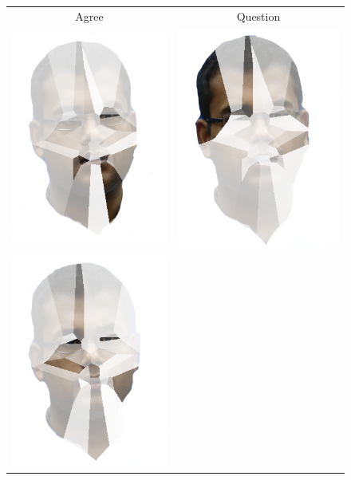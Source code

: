 \begin{figure}[tb]
\centering
\begin{tabular}{ cc }
Agree & Question \\
\includegraphics[width = 0.39 \columnwidth]{featureselection/visoutput-agree-crop-bng.png} &
\includegraphics[width = 0.39 \columnwidth]{featureselection/visoutput-question-crop-bng.png} \\
\includegraphics[width = 0.39 \columnwidth]{featureselection/visoutput-thinking-crop-bng.png} & 

\end{tabular}
\end{figure}
